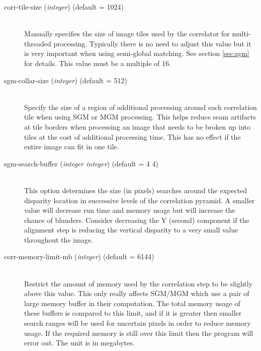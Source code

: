 \begin{description}
\item[corr-tile-size \textnormal{\small{(\emph{integer})}} (default = 1024)]\hfill \\

  Manually specifies the size of image tiles used by the correlator for multi-threaded
  processing. Typically there is no need to adjust this value but it is very important
  when using semi-global matching. See section \ref{sec:sgm} for details.  This value
  must be a multiple of 16.

\item[sgm-collar-size \textnormal{\small{(\emph{integer})}} (default = 512)]\hfill \\

  Specify the size of a region of additional processing around each correlation tile when
  using SGM or MGM processing.  This helps reduce seam artifacts at tile borders when
  processing an image that needs to be broken up into tiles at the cost of additional
  processing time.  This has no effect if the entire image can fit in one tile.

\item[sgm-search-buffer \textnormal{\small{(\emph{integer integer})}} (default = 4 4)] \hfill \\
  This option determines the size (in pixels) searches around the expected
  disparity location in successive levels of the correlation pyramid.  A smaller
  value will decrease run time and memory usage but will increase the chance of 
  blunders.  Consider decreasing the Y (second) component if the alignment step is
  reducing the vertical disparity to a very small value throughout the image.

\item[corr-memory-limit-mb \textnormal{\small{(\emph{integer})}} (default = 6144)]\hfill \\

  Restrict the amount of memory used by the correlation step to be slightly above this value.
  This only really affects SGM/MGM which use a pair of large memory buffer in their computation.
  The total memory usage of these buffers is compared to this limit, and if it is greater then
  smaller search ranges will be used for uncertain pixels in order to reduce memory usage. If 
  the required memory is still over this limit then the program will error out. The unit is
  in megabytes.

\end{description}



